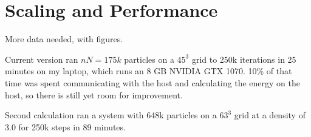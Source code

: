 \documentclass[12pt]{article}
\begin{document}
\section{Scaling and Performance}

More data needed, with figures.

Current version ran $nN = 175k$ particles on a $45^3$ grid to 250k iterations in 25 minutes on my laptop, which runs an 8 GB NVIDIA GTX 1070. 10\% of that time was spent communicating with the host and calculating the energy on the host, so there is still yet room for improvement.

Second calculation ran a system with 648k particles on a $63^3$ grid at a density of 3.0 for 250k steps in 89 minutes.
\end{document}
